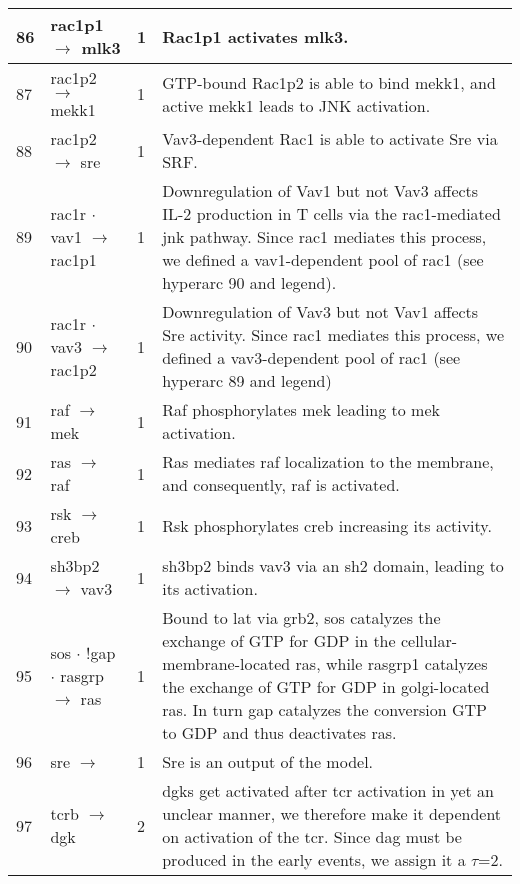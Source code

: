 \documentclass[a4paper, 12pt,epsfig, onecolumn]{article}
\newcommand{\mydot}{\hspace{-0mm} $\cdot$  \hspace{-0mm}}
\begin{document}
{\begin{center}
\begin{longtable}{|p{}|p{}|p{}|p{}|}
86& rac1p1 $\rightarrow$  mlk3   &1& Rac1p1 activates mlk3\cite{teramoto:1996}. \\ \hline
87& rac1p2 $\rightarrow$ mekk1     &1& GTP-bound Rac1p2        \phantom{\emph{}}  is able to bind mekk1\cite{FangerGR_EMBO_1997}, and active mekk1 leads to JNK activation\cite{minden:1995, Kaga_JI_1998}. \\ \hline
88& rac1p2 $\rightarrow$ sre   &1& Vav3-dependent Rac1 is able to activate Sre via SRF\cite{hill:1995}. \\ \hline
89& rac1r\mydot vav1 $\rightarrow$ rac1p1 &1& Downregulation of Vav1 but not Vav3 affects IL-2 production in T cells\cite{zakaria:2004} via the rac1-mediated jnk pathway.  Since rac1 mediates this process, we defined a vav1-dependent pool of rac1 (see hyperarc 90 and legend).\\ \hline
90& rac1r\mydot vav3 $\rightarrow$ rac1p2          &1& Downregulation of Vav3 but not Vav1 affects Sre activity\cite{zakaria:2004}. Since rac1 mediates this process, we defined a vav3-dependent pool of rac1 (see hyperarc 89 and legend)\\ \hline
91& raf $\rightarrow$ mek                              &1& Raf phosphorylates mek  leading to mek activation\cite{FranklinRA_JClinInvest_94}. \\ \hline
92& ras $\rightarrow$ raf                                  &1& Ras mediates raf localization to the membrane, and consequently, raf is activated\cite{Krauss}.\\ \hline
93& rsk $\rightarrow$ creb   &1& Rsk phosphorylates creb increasing its activity\cite{FrodinM_MCE_99}. \\ \hline
94& sh3bp2 $\rightarrow$ vav3        &1& sh3bp2 binds vav3 via an sh2 domain, leading to its activation\cite{zakaria:2004}. \\ \hline
95& sos\mydot !gap\mydot rasgrp $\rightarrow$ ras  &1& Bound to lat via grb2, sos catalyzes the exchange of GTP for GDP in the cellular-membrane-located ras, while rasgrp1 catalyzes the exchange of GTP for GDP in golgi-located ras\cite{DiFiore_Nature_03}. In turn gap catalyzes the conversion GTP to GDP and thus deactivates ras\cite{GenotE_CurrOpinImmunol_00}. \\ \hline
96& sre $\rightarrow$                                  &1& Sre is an output of the model. \\ \hline
97& tcrb $\rightarrow$ dgk                    &2& dgks get activated after tcr activation in yet an unclear manner, we therefore make it dependent on activation of the tcr. Since dag must be produced in the early events, we assign it a $\tau$=2\cite{SanjuanMA_JImmunol_03}. \\ \hline

\end{longtable}
\end{center}}
\end{document}
